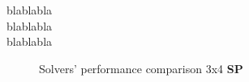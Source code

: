 
blablabla
\\
blablabla
\\
blablabla

\label{ssec:34SPSC}

\begin{figure}[H]
  \noindent
  \caption[34SPPerformance]{Solvers' performance comparison 3x4 \textbf{SP}}
   \label{fig:34SPPerformance}
\end{figure}









\label{ssec:44SPSC}

